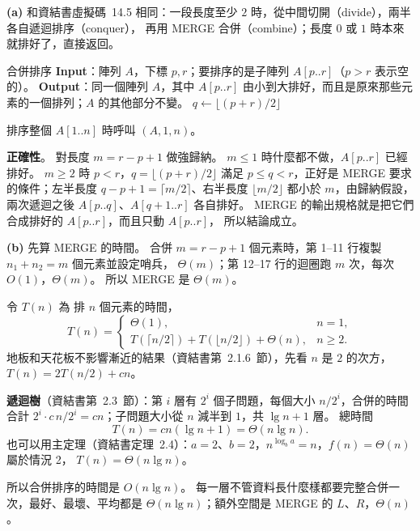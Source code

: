 \begin{pastsoln}
\textbf{(a)} 和資結書虛擬碼~14.5 相同：一段長度至少 $2$ 時，從中間切開（divide），兩半各自遞迴排序（conquer），
再用 MERGE 合併（combine）；長度 $0$ 或 $1$ 時本來就排好了，直接返回。

\begin{pseudo}{合併排序}
    \Statex \textbf{Input}：陣列 $A$，下標 $p, r$；要排序的是子陣列 $A[p..r]$（$p > r$ 表示空的）。
    \Statex \textbf{Output}：同一個陣列 $A$，其中 $A[p..r]$ 由小到大排好，而且是原來那些元素的一個排列；$A$ 的其他部分不變。
     
        \State $q \gets \lfloor (p + r)/2 \rfloor$ 
        \State {} 
        \State {} 
        \State {} 
    \EndIf
\EndProcedure
\end{pseudo}
排序整個 $A[1..n]$ 時呼叫 $(A, 1, n)$。

\textbf{正確性}。 對長度 $m = r - p + 1$ 做強歸納。 $m \le 1$ 時什麼都不做，$A[p..r]$ 已經排好。 $m \ge 2$ 時
$p < r$，$q = \lfloor (p + r)/2 \rfloor$ 滿足 $p \le q < r$，正好是 MERGE 要求的條件；左半長度
$q - p + 1 = \lceil m/2 \rceil$、右半長度 $\lfloor m/2 \rfloor$ 都小於 $m$，由歸納假設，兩次遞迴之後
$A[p..q]$、$A[q+1..r]$ 各自排好。 MERGE 的輸出規格就是把它們合成排好的 $A[p..r]$，而且只動 $A[p..r]$，
所以結論成立。

\textbf{(b)} 先算 MERGE 的時間。 合併 $m = r - p + 1$ 個元素時，第 1--11 行複製 $n_1 + n_2 = m$ 個元素並設定哨兵，
$\Theta(m)$；第 12--17 行的迴圈跑 $m$ 次，每次 $O(1)$，$\Theta(m)$。 所以 MERGE 是 $\Theta(m)$。

令 $T(n)$ 為  排 $n$ 個元素的時間，
\[
T(n) = \begin{cases}
\Theta(1), & n = 1,\\
T(\lceil n/2 \rceil) + T(\lfloor n/2 \rfloor) + \Theta(n), & n \ge 2.
\end{cases}
\]
地板和天花板不影響漸近的結果（資結書第~2.1.6~節），先看 $n$ 是 $2$ 的次方，$T(n) = 2T(n/2) + cn$。

\textbf{遞迴樹}（資結書第~2.3~節）：第 $i$ 層有 $2^i$ 個子問題，每個大小 $n/2^i$，合併的時間合計
$2^i \cdot c\,n/2^i = cn$；子問題大小從 $n$ 減半到 $1$，共 $\lg n + 1$ 層。 總時間
\[
T(n) = cn(\lg n + 1) = \Theta(n \lg n).
\]
也可以用主定理（資結書定理~2.4）：$a = 2$、$b = 2$，$n^{\log_b a} = n$，$f(n) = \Theta(n)$ 屬於情況 2，
$T(n) = \Theta(n \lg n)$。

所以合併排序的時間是 $O(n \lg n)$。 每一層不管資料長什麼樣都要完整合併一次，最好、最壞、平均都是
$\Theta(n \lg n)$；額外空間是 MERGE 的 $L$、$R$，$\Theta(n)$。
\end{pastsoln}

